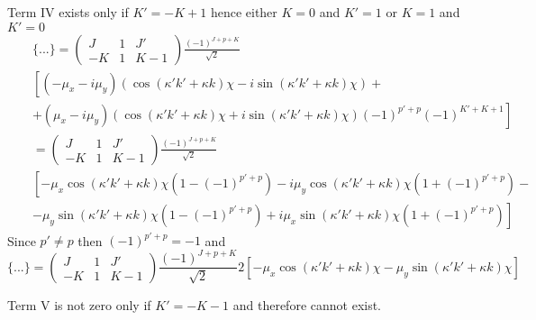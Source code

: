 Term IV exists only if $K' = -K +1$ hence either $K = 0$ and $K'=1$ or $K = 1$ and $K'=0$
\begin{eqnarray} \nonumber
&& \{...\} = 
\left( \begin{array}{ccc} 
 J &  1 &  J' \\
-K &  1 & K-1  \end{array} \right)
\frac{(-1)^{J+p+K}}{\sqrt{2}} \\ \nonumber
&& \left[ ( -\mu_x - i \mu_y) 
\left( \cos ( \kappa' k' + \kappa k) \chi - i \sin ( \kappa' k' + \kappa k) \chi \right) + \right. \\
&& \left.
+ ( \mu_x - i \mu_y)
\left( \cos ( \kappa' k' + \kappa k) \chi + i \sin ( \kappa' k' + \kappa k) \chi \right) (-1)^{p'+p} (-1)^{K'+K+1}
\right] \\ \nonumber
&& = 
\left( \begin{array}{ccc} 
 J &  1 &  J' \\
-K &  1 & K-1  \end{array} \right)
\frac{(-1)^{J+p+K}}{\sqrt{2}} \\ \nonumber
&& \left[ 
-  \mu_x \cos ( \kappa' k' + \kappa k) \chi \left( 1- (-1)^{p'+p} \right)
-i \mu_y \cos ( \kappa' k' + \kappa k) \chi \left( 1+ (-1)^{p'+p} \right) - \right. \\ 
&& \left.
-  \mu_y \sin ( \kappa' k' + \kappa k) \chi \left( 1- (-1)^{p'+p} \right)
+i \mu_x \sin ( \kappa' k' + \kappa k) \chi \left( 1+ (-1)^{p'+p} \right) \right]
\end{eqnarray}
Since $p' \ne p$ then $(-1)^{p'+p} = -1$ and
\begin{equation}
\{...\} = 
\left( \begin{array}{ccc} 
 J &  1 &  J' \\
-K &  1 & K-1  \end{array} \right)
\frac{(-1)^{J+p+K}}{\sqrt{2}} 2  \left[
- \mu_x \cos ( \kappa' k' + \kappa k) \chi -  \mu_y \sin ( \kappa' k' + \kappa k) \chi \right]
\end{equation}

Term V is not zero only if $K' = -K-1$ and therefore cannot exist.

